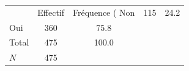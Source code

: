{
\def\sym#1{\ifmmode^{#1}\else\(^{#1}\)\fi}
\begin{tabular}{l*{1}{cc}}
\toprule
            &    Effectif&Fréquence (%
\midrule
Non         &         115&        24.2\\
Oui         &         360&        75.8\\
Total       &         475&       100.0\\
\midrule
\(N\)       &         475&            \\
\bottomrule
\end{tabular}
}
